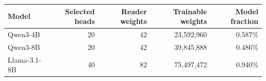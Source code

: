 \begingroup\renewcommand{\arraystretch}{1.08}
\begin{tabular}{lrrrr}
\toprule
\textbf{Model} & \textbf{Selected heads} & \textbf{Reader weights} & \textbf{Trainable weights} & \textbf{Model fraction} \\
\midrule
Qwen3-4B & 20 & 42 & 23,592,960 & 0.587\% \\
Qwen3-8B & 20 & 42 & 39,845,888 & 0.486\% \\
Llama-3.1-8B & 40 & 82 & 75,497,472 & 0.940\% \\
\bottomrule
\end{tabular}
\endgroup
